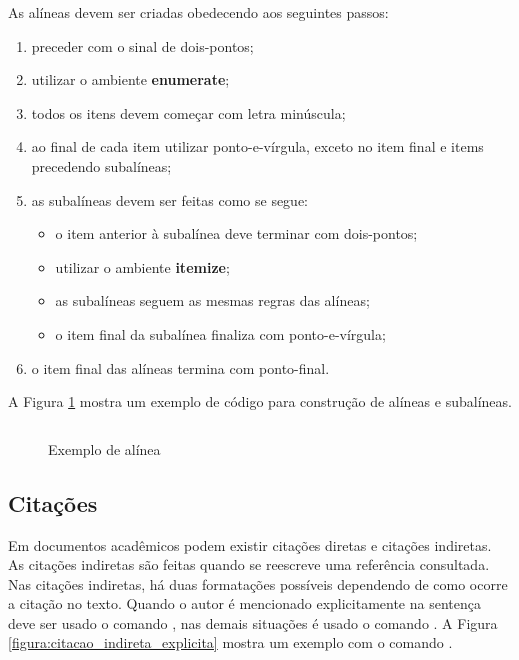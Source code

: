 \documentclass[artigo]{iftex2024}
\newcommand{\ElaboradoAutor}{Elaborado pelo autor, 2024.}
\begin{document}
As alíneas devem ser criadas obedecendo aos seguintes passos:
\begin{enumerate}
 \item preceder com o sinal de dois-pontos;
 \item utilizar o ambiente \textbf{enumerate};
 \item todos os itens devem começar com letra minúscula;
 \item ao final de cada item utilizar ponto-e-vírgula, exceto no item final e items precedendo subalíneas;
 \item as subalíneas devem ser feitas como se segue:
 \begin{itemize}
  \item o item anterior à subalínea deve terminar com dois-pontos;
  \item utilizar o ambiente \textbf{itemize};
  \item as subalíneas seguem as mesmas regras das alíneas;
  \item o item final da subalínea finaliza com ponto-e-vírgula;
 \end{itemize}
 \item o item final das alíneas termina com ponto-final.
\end{enumerate}

A Figura \ref{fig:exemplo_alinea} mostra um exemplo de código para construção de alíneas e subalíneas.

\begin{figure}[!htb] \centering
\caption{Exemplo de alínea} \label{fig:exemplo_alinea}
\begin{varwidth}{\linewidth}
\inputminted{latex}{figuras/exemplo_alinea.tex}
\vspace{-1em}
\legend{\ElaboradoAutor}
\end{varwidth}
\end{figure}

\subsection{Citações}

Em documentos acadêmicos podem existir citações diretas e citações indiretas.
As citações indiretas são feitas quando se reescreve uma referência consultada.
Nas citações indiretas, há duas formatações possíveis dependendo de como ocorre a citação no texto.
Quando o autor é mencionado explicitamente na sentença deve ser usado o comando , nas demais situações é usado o comando .
A Figura \ref{figura:citacao_indireta_explicita} mostra um exemplo com o comando .
\end{document}
